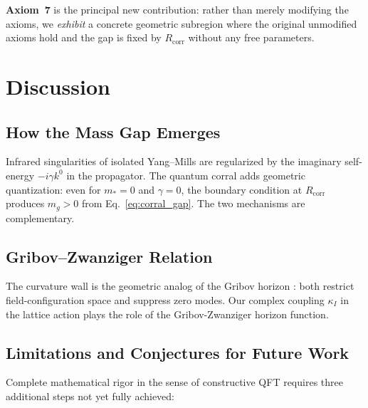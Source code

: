 \documentclass[12pt,a4paper]{article}
\theoremstyle{definition}
\newcommand{\Rcorr}{R_{\mathrm{corr}}}
\begin{document}
\textbf{Axiom~7} is the principal new contribution: rather than merely
modifying the axioms, we \emph{exhibit} a concrete geometric subregion
where the original unmodified axioms hold and the gap is fixed by
$\Rcorr$ without any free parameters.

\section{Discussion}
\label{sec:discussion}

\subsection{How the Mass Gap Emerges}

Infrared singularities of isolated Yang--Mills are regularized by the
imaginary self-energy $-i\gamma k^{0}$ in the propagator. The quantum
corral adds geometric quantization: even for $m_{*} = 0$ and $\gamma = 0$,
the boundary condition at $\Rcorr$ produces $m_{g} > 0$ from
Eq.~\eqref{eq:corral_gap}. The two mechanisms are complementary.

\subsection{Gribov--Zwanziger Relation}

The curvature wall is the geometric analog of the Gribov horizon
\cite{Gribov1978,Zwanziger1989}: both restrict field-configuration space
and suppress zero modes. Our complex coupling $\kappa_{I}$ in the lattice
action plays the role of the Gribov-Zwanziger horizon function.

\subsection{Limitations and Conjectures for Future Work}
\label{subsec:limitations}

Complete mathematical rigor in the sense of constructive QFT requires
three additional steps not yet fully achieved:
\end{document}
